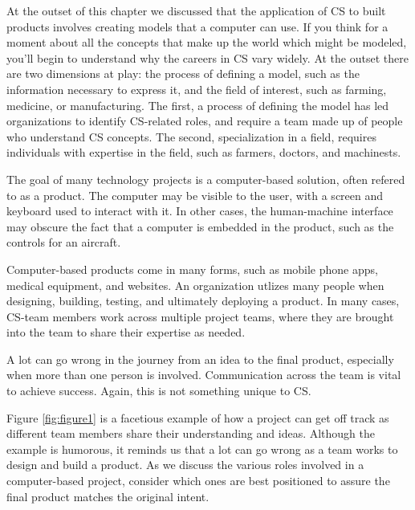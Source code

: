 At the outset of this chapter we discussed that the application of CS to built products involves creating models that a computer can use. If you think for a moment about all the concepts that make up the world which might be modeled, you'll begin to understand why the careers in CS vary widely. At the outset there are two dimensions at play: the process of defining a model, such as the information necessary to express it, and the field of interest, such as farming, medicine, or manufacturing. The first, a process of defining the model has led organizations to identify CS-related roles, and require a team made up of people who understand CS concepts. The second, specialization in a field, requires individuals with expertise in the field, such as farmers, doctors, and machinests.

The goal of many technology projects is a computer-based solution, often refered to as a product. The computer may be visible to the user, with a screen and keyboard used to interact with it. In other cases, the human-machine interface may obscure the fact that a computer is embedded in the product, such as the controls for an aircraft.

Computer-based products come in many forms, such as mobile phone apps, medical equipment, and websites. An organization utlizes many people when designing, building, testing, and ultimately deploying a product. In many cases, CS-team members work across multiple project teams, where they are brought into the team to share their expertise as needed. 

A lot can go wrong in the journey from an idea to the final product, especially when more than one person is involved. Communication across the team is vital to achieve success. Again, this is not something unique to CS. 

Figure \ref{fig:figure1} is a facetious example of how a project can get off track as different team members share their understanding and ideas. Although the example is humorous, it reminds us that a lot can go wrong as a team works to design and build a product. As we discuss the various roles involved in a computer-based project, consider which ones are best positioned to assure the final product matches the original intent.

